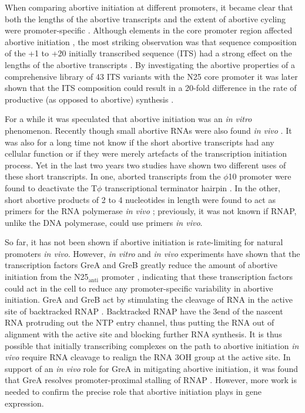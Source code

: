 When comparing abortive initiation at different promoters, it became clear that
both the lengths of the abortive transcripts and the extent of abortive cycling
were promoter-specific \cite{hsu_vitro_2003}. Although elements in the core
promoter region affected abortive initiation \cite{vo_vitro_2003}, the most
striking observation was that sequence composition of the +1 to +20 initially
transcribed sequence (ITS) had a strong effect on the lengths of the abortive
transcripts \cite{hsu_vitro_2003}. By investigating the abortive properties of
a comprehensive library of 43 ITS variants with the N25 core promoter it was
later shown that the ITS composition could result in a 20-fold difference in
the rate of productive (as opposed to abortive) synthesis \cite{hsu_initial_2006}. 

For a while it was speculated that abortive initiation was an \textit{in vitro}
phenomenon. Recently though small abortive RNAs were also found \textit{in
vivo} \cite{goldman_direct_2009}. It was also for a long time not know if the
short abortive transcripts had any cellular function or if they were merely
artefacts of the transcription initiation process. Yet in the last two years two
studies have shown two different uses of these short transcripts. In one,
aborted transcripts from the $\phi$10 promoter were found to deactivate the
T$\phi$ transcriptional terminator hairpin \cite{lee_tiny_2010}. In the other,
short abortive products of 2 to 4 nucleotides in length were found to act as
primers for the RNA polymerase \textit{in vivo} \cite{goldman_nanornas_2011};
previously, it was not known if RNAP, unlike the DNA polymerase, could use
primers \textit{in vivo}.

So far, it has not been shown if abortive initiation is rate-limiting for
natural promoters \textit{in vivo}. However, \textit{in vitro} and \textit{in vivo}
experiments have shown that the transcription factors GreA and GreB greatly
reduce the amount of abortive initiation from the N25$_{\text{anti}}$ promoter
\cite{hsu_escherichia_1995}, indicating that these transcription factors could
act in the cell to reduce any promoter-specific variability in abortive
initiation. GreA and GreB act by stimulating the cleavage of RNA in the active
site of backtracked RNAP \cite{toulme_grea_2000}. Backtracked RNAP have the
3\p end of the nascent RNA protruding out the NTP entry channel, thus putting
the RNA out of alignment with the active site and blocking further RNA
synthesis. It is thus possible that initially transcribing complexes on the
path to abortive initiation \textit{in vivo} require RNA cleavage to realign
the RNA 3\p OH group at the active site. In support of an \textit{in vivo} role
for GreA in mitigating abortive initiation, it was found that GreA resolves
promoter-proximal stalling of RNAP \cite{kusuya_transcription_2011}. However,
more work is needed to confirm the precise role that abortive initiation plays
in gene expression.


